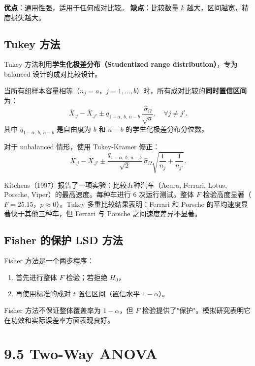 \textbf{优点}：通用性强，适用于任何成对比较。
\textbf{缺点}：比较数量 $k$ 越大，区间越宽，精度损失越大。

\subsection{Tukey 方法}

Tukey 方法利用\textbf{学生化极差分布（Studentized range distribution）}，专为 balanced 设计的成对比较设计。

当所有组样本容量相等（$n_j = a$，$j = 1, \ldots, b$）时，所有成对比较的\textbf{同时置信区间}为：
\[
\bar{X}_{.j} - \bar{X}_{.j'} \pm q_{1-\alpha,\ b,\ n-b}\ \frac{\hat{\sigma}_\Omega}{\sqrt{a}},\quad \forall j \neq j'.
\label{eq:tukey-ci}
\]
其中 $q_{1-\alpha,\ b,\ n-b}$ 是自由度为 $b$ 和 $n-b$ 的学生化极差分布分位数。

对于 unbalanced 情形，使用 Tukey-Kramer 修正：
\[
\bar{X}_{.j} - \bar{X}_{.j'} \pm \frac{q_{1-\alpha,\ b,\ n-b}}{\sqrt{2}}\ \hat{\sigma}_\Omega \sqrt{\frac{1}{n_j} + \frac{1}{n_{j'}}}.
\label{eq:tukey-kramer-ci}
\]

\begin{example}[赛车速度比较]\label{ex:car-speed-tukey}
Kitchens（1997）报告了一项实验：比较五种汽车（Acura, Ferrari, Lotus, Porsche, Viper）的最高速度。每种车进行 6 次运行测试。整体 $F$ 检验高度显著（$F = 25.15$，$p \approx 0$）。Tukey 多重比较结果表明：Ferrari 和 Porsche 的平均速度显著快于其他三种车，但 Ferrari 与 Porsche 之间速度差异不显著。
\end{example}

\subsection{Fisher 的保护 LSD 方法}

Fisher 方法是一个两步程序：
\begin{enumerate}
\item 首先进行整体 $F$ 检验；若拒绝 $H_0$，
\item 再使用标准的成对 $t$ 置信区间（置信水平 $1-\alpha$）。
\end{enumerate}

Fisher 方法不保证整体覆盖率为 $1-\alpha$，但 $F$ 检验提供了"保护"。模拟研究表明它在功效和实际误差率方面表现良好。

\section{9.5 Two-Way ANOVA}\label{sec:9.5}

